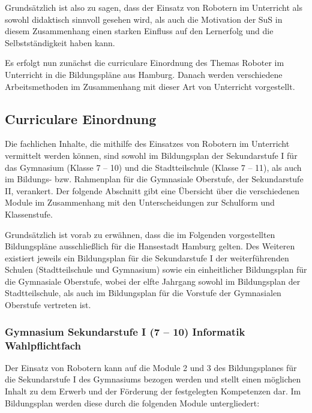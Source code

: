 \documentclass[paper=a4, DIV=calc, BCOR=12mm, twoside=on, onecolumn=on, open = right, titlepage =on, parskip =half-, headsepline = on, footsepline = off, chapterprefix = off, appendixprefix = on, fontsize = 12pt, numbers = noenddot, abstract = on]{scrbook}
\begin{document}
Grundsätzlich ist also zu sagen, dass der Einsatz von Robotern im Unterricht als sowohl didaktisch sinnvoll gesehen wird, als auch die Motivation der SuS in diesem Zusammenhang einen starken Einfluss auf den Lernerfolg und die Selbstständigkeit haben kann. 

Es erfolgt nun zunächst die curriculare Einordnung des Themas Roboter im Unterricht in die Bildungspläne aus Hamburg. Danach werden verschiedene Arbeitsmethoden im Zusammenhang mit dieser Art von Unterricht vorgestellt.
\clearpage

\subsection{Curriculare Einordnung}
Die fachlichen Inhalte, die mithilfe des Einsatzes von Robotern im Unterricht vermittelt werden können, sind sowohl im Bildungsplan der Sekundarstufe I für das Gymnasium (Klasse 7 -- 10) und die Stadtteilschule (Klasse 7 -- 11), als auch im Bildungs- bzw. Rahmenplan für die Gymnasiale Oberstufe, der Sekundarstufe II, verankert. Der folgende Abschnitt gibt eine Übersicht über die verschiedenen Module im Zusammenhang mit den Unterscheidungen zur Schulform und Klassenstufe.

Grundsätzlich ist vorab zu erwähnen, dass die im Folgenden vorgestellten Bildungspläne ausschließlich für die Hansestadt Hamburg gelten. Des Weiteren existiert jeweils ein Bildungsplan für die Sekundarstufe I der weiterführenden Schulen (Stadtteilschule und Gymnasium) sowie ein einheitlicher Bildungsplan für die Gymnasiale Oberstufe, wobei der elfte Jahrgang sowohl im Bildungsplan der Stadtteilschule, als auch im Bildungsplan für die Vorstufe der Gymnasialen Oberstufe vertreten ist. 
\subsubsection{Gymnasium Sekundarstufe I (7 -- 10) Informatik Wahlpflichtfach}
Der Einsatz von Robotern kann auf die Module 2 und 3 des Bildungsplanes für die Sekundarstufe I des Gymnasiums bezogen werden und stellt einen möglichen Inhalt zu dem Erwerb und der Förderung der festgelegten Kompetenzen dar. Im Bildungsplan werden diese durch die folgenden Module untergliedert:
\clearpage
\end{document}
